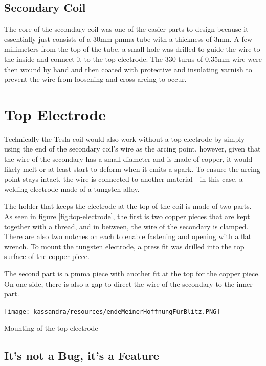 \subsection{Secondary Coil}

The core of the secondary coil was one of the easier parts to design because it essentially just consists of a 30mm \gls{pmma} tube with a thickness of 3mm. A few millimeters from the top of the tube, a small hole was drilled to guide the wire to the inside and connect it to the top electrode. The 330 turns of 0.35mm wire were then wound by hand and then coated with protective and insulating varnish to prevent the wire from loosening and cross-arcing to occur.


\section{Top Electrode}

Technically the Tesla coil would also work without a top electrode by simply using the end of the secondary coil's wire as the arcing point. however, given that the wire of the secondary has a small diameter and is made of copper, it would likely melt or at least start to deform when it emits a spark. To ensure the arcing point stays intact, the wire is connected to another material - in this case, a welding electrode made of a tungsten alloy. 

The holder that keeps the electrode at the top of the coil is made of two parts. As seen in figure \ref{fig:top-electrode}, the first is two copper pieces that are kept together with a thread, and in between, the wire of the secondary is clamped. There are also two notches on each to enable fastening and opening with a flat wrench. To mount the tungsten electrode, a press fit was drilled into the top surface of the copper piece. 

The second part is a \gls{pmma} piece with another fit at the top for the copper piece. On one side, there is also a gap to direct the wire of the secondary to the inner part. 

\begin{marginfigure}[-8cm]
    \centering
    \texttt{[image: kassandra/resources/endeMeinerHoffnungFürBlitz.PNG]}
    \caption{Mounting of the top electrode}
    \label{fig:top-electrode}
\end{marginfigure}

\subsection{It's not a Bug, it's a Feature}


